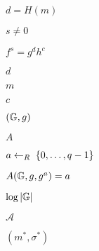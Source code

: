 \documentclass[10pt]{book}
\begin{document}
\begin{mdSnippets}
\begin{mdInlineSnippet}%
$d=H(m)$\end{mdInlineSnippet}%
\begin{mdInlineSnippet}[20c35bcbc6c26f6e25074520fb42799b]%
$s\neq 0$\end{mdInlineSnippet}%
\begin{mdInlineSnippet}[af5fc703c7237084f03acf9ed431bd51]%
$f^s=g^{d}h^{c}$\end{mdInlineSnippet}%
\begin{mdInlineSnippet}[8277e0910d750195b448797616e091ad]%
$d$\end{mdInlineSnippet}%
\begin{mdInlineSnippet}[6f8f57715090da2632453988d9a1501b]%
$m$\end{mdInlineSnippet}%
\begin{mdInlineSnippet}[4a8a08f09d37b73795649038408b5f33]%
$c$\end{mdInlineSnippet}%
\begin{mdInlineSnippet}[5154bc8b30cccd78d0a3b9225e98fd6b]%
$(\mathbb{G},g)$\end{mdInlineSnippet}%
\begin{mdInlineSnippet}[7fc56270e7a70fa81a5935b72eacbe29]%
$A$\end{mdInlineSnippet}%
\begin{mdInlineSnippet}[4514fd260a6d4d03b98d02f4956474f0]%
$a \leftarrow_R\; \{0,\ldots, q-1\}$\end{mdInlineSnippet}%
\begin{mdInlineSnippet}[71479a0d1104db913ea7e37f6d7b1a50]%
$A(\mathbb{G},g,g^a)=a$\end{mdInlineSnippet}%
\begin{mdInlineSnippet}[4be6ae07799d846ba2647ffd3c94f3a7]%
$\log |\mathbb{G}|$\end{mdInlineSnippet}%
\begin{mdInlineSnippet}[ad70146b431bea9ae74cf8385470c544]%
$\mathcal{A}$\end{mdInlineSnippet}%
\begin{mdInlineSnippet}[1008ab34a764ff91daf540437a7c7c18]%
$(m^*, \sigma^*)$\end{mdInlineSnippet}%

\end{mdSnippets}
\end{document}

